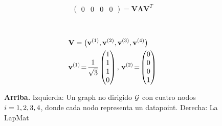 {{\begin{figure}[H]
\begin{center}
\begin{minipage}{0.4\textwidth}
\begin{equation}
\begin{pmatrix}
							0 & 0 & 0 & 0 
						\end{pmatrix}\!=\!\mathbf{V} {\bm \Lambda} \mathbf{V}^{T}  
						\nonumber
					\end{equation} 
				\end{minipage}
				\vspace*{20mm}\\
				  \begin{minipage}{0.4\textwidth}
				\end{minipage} 
    		\begin{minipage}{0.4\textwidth}
										\begin{align}
											& \mathbf{V} = \big( {\bf v}^{(1)},{\bf v}^{(2)},{\bf v}^{(3)},{\bf v}^{(4)} \big) \nonumber \\
											&	\mathbf{v}^{(1)}\!=\!\frac{1}{\sqrt{3}} \begin{pmatrix} 1 \\ 1 \\ 1 \\ 0 \end{pmatrix}, \,
												\mathbf{v}^{(2)}\!=\!\begin{pmatrix} 0 \\ 0 \\ 0 \\ 1 \end{pmatrix} \nonumber 
												\end{align}
				\end{minipage} 
				\caption{\label{fig_lap_mtx_specclustering_dict} {\bf Arriba.} Izquierda: Un \gls{graph} no dirigido
					$\mathcal{G}$ con cuatro nodos $i=1,2,3,4$, donde cada nodo representa un \gls{datapoint}. Derecha: La \gls{LapMat} 
}
\end{center}
\end{figure}}}
